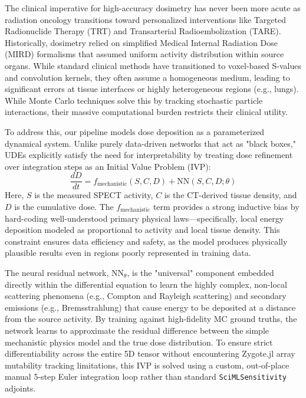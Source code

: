 \documentclass[10pt,letterpaper]{article}
\begin{document}
The clinical imperative for high-accuracy dosimetry has never been more acute as radiation oncology transitions toward personalized interventions like Targeted Radionuclide Therapy (TRT) and Transarterial Radioembolization (TARE). Historically, dosimetry relied on simplified Medical Internal Radiation Dose (MIRD) formalisms that assumed uniform activity distribution within source organs. While standard clinical methods have transitioned to voxel-based S-values and convolution kernels, they often assume a homogeneous medium, leading to significant errors at tissue interfaces or highly heterogeneous regions (e.g., lungs). While Monte Carlo techniques solve this by tracking stochastic particle interactions, their massive computational burden restricts their clinical utility.

To address this, our pipeline models dose deposition as a parameterized dynamical system. Unlike purely data-driven networks that act as "black boxes," UDEs explicitly satisfy the need for interpretability by treating dose refinement over integration steps as an Initial Value Problem (IVP):
\begin{equation}
\frac{dD}{dt} = f_{\text{mechanistic}}(S, C, D) + \text{NN}(S, C, D; \theta)
\end{equation}
Here, $S$ is the measured SPECT activity, $C$ is the CT-derived tissue density, and $D$ is the cumulative dose. The $f_{\text{mechanistic}}$ term provides a strong inductive bias by hard-coding well-understood primary physical laws—specifically, local energy deposition modeled as proportional to activity and local tissue density. This constraint ensures data efficiency and safety, as the model produces physically plausible results even in regions poorly represented in training data. 

The neural residual network, $\text{NN}_{\theta}$, is the "universal" component embedded directly within the differential equation to learn the highly complex, non-local scattering phenomena (e.g., Compton and Rayleigh scattering) and secondary emissions (e.g., Bremsstrahlung) that cause energy to be deposited at a distance from the source activity. By training against high-fidelity MC ground truths, the network learns to approximate the residual difference between the simple mechanistic physics model and the true dose distribution. To ensure strict differentiability across the entire 5D tensor without encountering Zygote.jl array mutability tracking limitations, this IVP is solved using a custom, out-of-place manual 5-step Euler integration loop rather than standard \texttt{SciMLSensitivity} adjoints.
\end{document}
